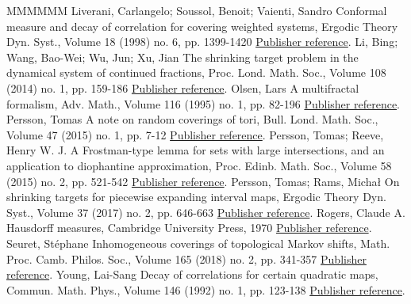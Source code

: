 \documentclass[11pt]{article}
\theoremstyle{definition}
\numberwithin{equation}{section}
\numberwithin{figure}{section}
\numberwithin{table}{section}
\begin{document}
\begin{thebibliography}{MMMMMM}
 Liverani, Carlangelo; Soussol, Benoit; Vaienti, Sandro Conformal measure and decay of correlation for covering weighted systems, Ergodic Theory Dyn. Syst., Volume 18 (1998) no. 6, pp. 1399-1420 \href{https://ahl.centre-mersenne.org/item/AHL_2019__2__1_0/#liveranietal}{Publisher reference}.
 Li, Bing; Wang, Bao-Wei; Wu, Jun; Xu, Jian The shrinking target problem in the dynamical system of continued fractions, Proc. Lond. Math. Soc., Volume 108 (2014) no. 1, pp. 159-186 \href{https://ahl.centre-mersenne.org/item/AHL_2019__2__1_0/#liwangwuxu}{Publisher reference}.
 Olsen, Lars A multifractal formalism, Adv. Math., Volume 116 (1995) no. 1, pp. 82-196 \href{https://ahl.centre-mersenne.org/item/AHL_2019__2__1_0/#olsen}{Publisher reference}.
 Persson, Tomas A note on random coverings of tori, Bull. Lond. Math. Soc., Volume 47 (2015) no. 1, pp. 7-12 \href{https://ahl.centre-mersenne.org/item/AHL_2019__2__1_0/#persson}{Publisher reference}.
 Persson, Tomas; Reeve, Henry W. J. A Frostman-type lemma for sets with large intersections, and an application to diophantine approximation, Proc. Edinb. Math. Soc., Volume 58 (2015) no. 2, pp. 521-542 \href{https://ahl.centre-mersenne.org/item/AHL_2019__2__1_0/#perssonreeve}{Publisher reference}.
 Persson, Tomas; Rams, Michał On shrinking targets for piecewise expanding interval maps, Ergodic Theory Dyn. Syst., Volume 37 (2017) no. 2, pp. 646-663 \href{https://ahl.centre-mersenne.org/item/AHL_2019__2__1_0/#perssonrams}{Publisher reference}.
 Rogers, Claude A. Hausdorff measures, Cambridge University Press, 1970 \href{https://ahl.centre-mersenne.org/item/AHL_2019__2__1_0/#rogers}{Publisher reference}.
 Seuret, Stéphane Inhomogeneous coverings of topological Markov shifts, Math. Proc. Camb. Philos. Soc., Volume 165 (2018) no. 2, pp. 341-357 \href{https://ahl.centre-mersenne.org/item/AHL_2019__2__1_0/#seuret}{Publisher reference}.
 Young, Lai-Sang Decay of correlations for certain quadratic maps, Commun. Math. Phys., Volume 146 (1992) no. 1, pp. 123-138 \href{https://ahl.centre-mersenne.org/item/AHL_2019__2__1_0/#young}{Publisher reference}.
\end{thebibliography}
\end{document}
